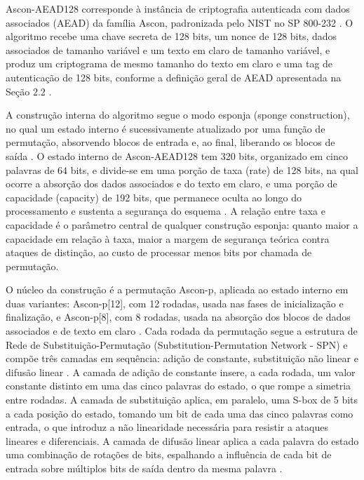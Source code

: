 Ascon-AEAD128 corresponde à instância de criptografia autenticada com dados associados (AEAD) da família Ascon, padronizada pelo NIST no SP 800-232 \cite{nist_sp800232_2025}. O algoritmo recebe uma chave secreta de 128 bits, um nonce de 128 bits, dados associados de tamanho variável e um texto em claro de tamanho variável, e produz um criptograma de mesmo tamanho do texto em claro e uma tag de autenticação de 128 bits, conforme a definição geral de AEAD apresentada na Seção 2.2 \cite{nist_sp800232_2025}.

A construção interna do algoritmo segue o modo esponja (sponge construction), no qual um estado interno é sucessivamente atualizado por uma função de permutação, absorvendo blocos de entrada e, ao final, liberando os blocos de saída \cite{nist_sp800232_2025}. O estado interno de Ascon-AEAD128 tem 320 bits, organizado em cinco palavras de 64 bits, e divide-se em uma porção de taxa (rate) de 128 bits, na qual ocorre a absorção dos dados associados e do texto em claro, e uma porção de capacidade (capacity) de 192 bits, que permanece oculta ao longo do processamento e sustenta a segurança do esquema \cite{nist_sp800232_2025}. A relação entre taxa e capacidade é o parâmetro central de qualquer construção esponja: quanto maior a capacidade em relação à taxa, maior a margem de segurança teórica contra ataques de distinção, ao custo de processar menos bits por chamada de permutação.

O núcleo da construção é a permutação Ascon-p, aplicada ao estado interno em duas variantes: Ascon-p[12], com 12 rodadas, usada nas fases de inicialização e finalização, e Ascon-p[8], com 8 rodadas, usada na absorção dos blocos de dados associados e de texto em claro \cite{nist_sp800232_2025}. Cada rodada da permutação segue a estrutura de Rede de Substituição-Permutação (Substitution-Permutation Network - SPN) e compõe três camadas em sequência: adição de constante, substituição não linear e difusão linear \cite{nist_sp800232_2025}. A camada de adição de constante insere, a cada rodada, um valor constante distinto em uma das cinco palavras do estado, o que rompe a simetria entre rodadas. A camada de substituição aplica, em paralelo, uma S-box de 5 bits a cada posição do estado, tomando um bit de cada uma das cinco palavras como entrada, o que introduz a não linearidade necessária para resistir a ataques lineares e diferenciais. A camada de difusão linear aplica a cada palavra do estado uma combinação de rotações de bits, espalhando a influência de cada bit de entrada sobre múltiplos bits de saída dentro da mesma palavra \cite{nist_sp800232_2025}.

